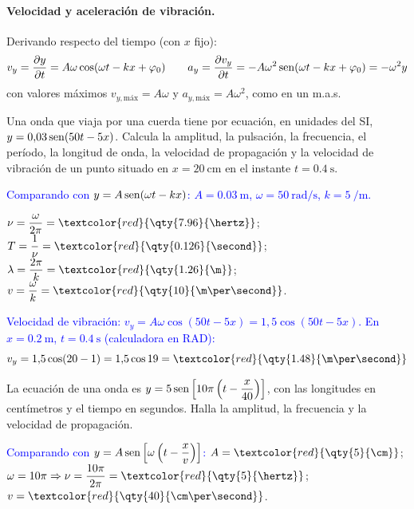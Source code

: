 \paragraph{Velocidad y aceleración de vibración.} Derivando respecto del tiempo (con \(x\) fijo):
\begin{equation*}
    v_y = \dfrac{\partial y}{\partial t} = A\omega\cos(\omega t - kx + \varphi_0) \qquad
    a_y = \dfrac{\partial v_y}{\partial t} = -A\omega^2\operatorname{sen}(\omega t - kx + \varphi_0) = -\omega^2 y
\end{equation*}
con valores máximos \(v_{y,\text{máx}} = A\omega\) y \(a_{y,\text{máx}} = A\omega^2\), como en un m.a.s.

\begin{exercise}
    Una onda que viaja por una cuerda tiene por ecuación, en unidades del SI, \(y = 0{,}03\operatorname{sen}(50t - 5x)\). Calcula la
    amplitud, la pulsación, la frecuencia, el período, la longitud de onda, la velocidad de propagación y la velocidad de
    vibración de un punto situado en \(x = \qty{20}{\cm}\) en el instante \(t = \qty{0.4}{\second}\).
    \begin{solu}
        \textcolor{blue}{Comparando con \(y = A\operatorname{sen}(\omega t - kx)\): \(A = \qty{0.03}{\m}\), \(\omega = \qty{50}{\radian\per\second}\), \(k = \qty{5}{\per\m}\).}

        \(\nu = \dfrac{\omega}{2\pi} = \textcolor{red}{\qty{7.96}{\hertz}}\); \(T = \dfrac{1}{\nu} = \textcolor{red}{\qty{0.126}{\second}}\);
        \(\lambda = \dfrac{2\pi}{k} = \textcolor{red}{\qty{1.26}{\m}}\); \(v = \dfrac{\omega}{k} = \textcolor{red}{\qty{10}{\m\per\second}}\).

        \textcolor{blue}{Velocidad de vibración: \(v_y = A\omega\cos(50t - 5x) = 1{,}5\cos(50t - 5x)\). En \(x = \qty{0.2}{\m}\), \(t = \qty{0.4}{\second}\) (calculadora en RAD):}
        \[ v_y = 1{,}5\cos(20 - 1) = 1{,}5\cos 19 = \textcolor{red}{\qty{1.48}{\m\per\second}} \]
    \end{solu}
\end{exercise}

\begin{exercise}
    La ecuación de una onda es \(y = 5\operatorname{sen}\left[10\pi\left(t - \dfrac{x}{40}\right)\right]\), con las longitudes en
    centímetros y el tiempo en segundos. Halla la amplitud, la frecuencia y la velocidad de propagación.
    \begin{solu}
        \textcolor{blue}{Comparando con \(y = A\operatorname{sen}\left[\omega\left(t - \dfrac{x}{v}\right)\right]\):}
        \(A = \textcolor{red}{\qty{5}{\cm}}\); \(\omega = 10\pi \Rightarrow \nu = \dfrac{10\pi}{2\pi} = \textcolor{red}{\qty{5}{\hertz}}\);
        \(v = \textcolor{red}{\qty{40}{\cm\per\second}}\).
    \end{solu}
\end{exercise}

